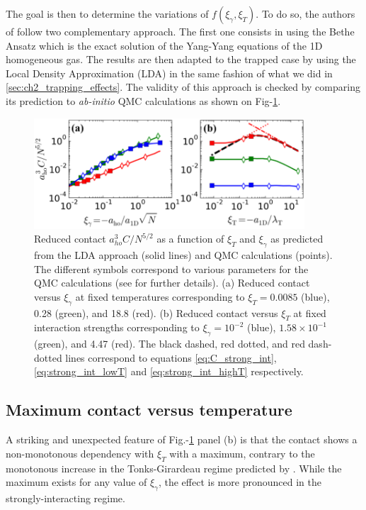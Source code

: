 The goal is then to determine the variations of $f(\xi_{\gamma},\xi_{T})$. To do so, the authors of \cite{yao2018tan} follow two complementary approach. The first one consists in using the Bethe Ansatz which is the exact solution of the Yang-Yang equations \cite{yang1969thermodynamics} of the 1D homogeneous gas. The results are then adapted to the trapped case by using the Local Density Approximation (LDA) in the same fashion of what we did in \ref{sec:ch2_trapping_effects}. The validity of this approach is checked by comparing its prediction to {\it ab-initio} QMC calculations as shown on Fig-\ref{fig:C_theo}.

\begin{figure}
    \centering
    \includegraphics[width=0.9\textwidth]{Fig/Chapter5/BS_LDA_vs_Bethe.PNG}
    \caption{Reduced contact $a_{ho}^3 C / N^{5/2}$ as a function of $\xi_T$ and $\xi_{\gamma}$ as predicted from the LDA approach (solid lines) and QMC calculations (points). The different symbols correspond to various parameters for the QMC calculations (see \cite{yao2018tan} for further details). (a) Reduced contact versus $\xi_{\gamma}$ at fixed temperatures corresponding to $\xi_T = 0.0085$ (blue), 0.28 (green), and 18.8 (red). (b) Reduced contact versus $\xi_T$  at fixed interaction strengths corresponding to $\xi_\gamma = 10^{-2}$ (blue), $1.58 \times 10^{-1}$ (green), and 4.47 (red). The black dashed, red dotted, and red dash-dotted lines correspond to equations \ref{eq:C_strong_int}, \ref{eq:strong_int_lowT} and \ref{eq:strong_int_highT} respectively.}
    \label{fig:C_theo}
\end{figure}

\subsection{Maximum contact versus temperature}

A striking and unexpected feature of Fig.-\ref{fig:C_theo} panel (b) is that the contact shows a non-monotonous dependency with $\xi_T$ with a maximum, contrary to the monotonous increase in the Tonks-Girardeau regime predicted by \cite{vignolo2013universal}. While the maximum exists for any value of $\xi_{\gamma}$, the effect is more pronounced in the strongly-interacting regime. 

